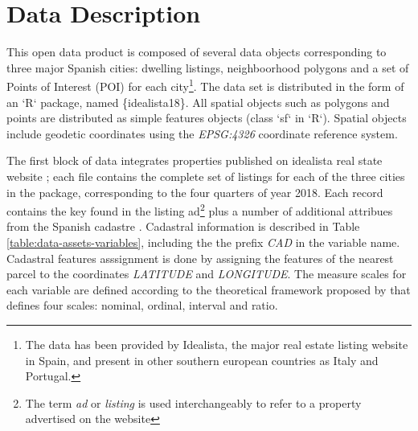 \documentclass[times,final]{elsarticle}
\begin{document}
\section*{Data Description}

\noindent

This open data product \cite{arribas2021open} is composed of several data objects corresponding to three major Spanish cities: dwelling listings, neighboorhood polygons and a set of Points of Interest (POI) for each city\footnote{The data has been provided by Idealista, the major real estate listing website in Spain, and present in other southern european countries as Italy and Portugal.}. The data set is distributed in the form of an `R` package, named \{idealista18\}. All spatial objects such as polygons and points are distributed as simple features objects (class `sf` in `R`). Spatial objects include geodetic coordinates using the \emph{EPSG:4326} coordinate reference system.

The first block of data integrates properties published on idealista real state website \cite{idealista}; each file contains the complete set of listings for each of the three cities in the package, corresponding to the four quarters of year 2018. Each record contains the key found in the listing ad\footnote{The term \emph{ad} or \emph{listing} is used interchangeably to refer to a property advertised on the website} plus a number of additional attribues from the Spanish cadastre \cite{Catastro}. Cadastral information is described in Table \ref{table:data-assets-variables}, including the the prefix \emph{CAD} in the variable name. Cadastral features asssignment is done by assigning the features of the nearest parcel to the coordinates \emph{LATITUDE} and \emph{LONGITUDE}. The measure scales for each variable are defined according to the theoretical framework proposed by \cite{stevens1946theory} that defines four scales: nominal, ordinal, interval and ratio.
\end{document}
